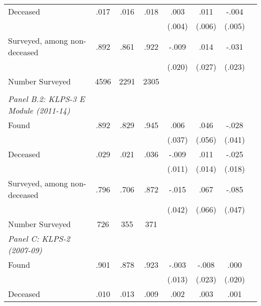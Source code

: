 \begin{tabular}{l*{7}{c}}
Deceased            &        .017&        .016&        .018&        .003         &        .011\sym{*}  &       -.004         \\
                    &            &            &            &      (.004)         &      (.006)         &      (.005)         \\
Surveyed, among non-deceased&        .892&        .861&        .922&       -.009         &        .014         &       -.031         \\
                    &            &            &            &      (.020)         &      (.027)         &      (.023)         \\
Number Surveyed     &        4596&        2291&        2305&                     &                     &                     \\
& & & & & & \\ \emph{Panel B.2: KLPS-3 E Module (2011-14)} & & & & & & \\ Found&        .892&        .829&        .945&        .006         &        .046         &       -.028         \\
                    &            &            &            &      (.037)         &      (.056)         &      (.041)         \\
Deceased            &        .029&        .021&        .036&       -.009         &        .011         &       -.025         \\
                    &            &            &            &      (.011)         &      (.014)         &      (.018)         \\
Surveyed, among non-deceased&        .796&        .706&        .872&       -.015         &        .067         &       -.085\sym{*}  \\
                    &            &            &            &      (.042)         &      (.066)         &      (.047)         \\
Number Surveyed     &         726&         355&         371&                     &                     &                     \\
\midrule
\emph{Panel C: KLPS-2 (2007-09)} & & & & & & \\ Found&        .901&        .878&        .923&       -.003         &       -.008         &        .000         \\
                    &            &            &            &      (.013)         &      (.023)         &      (.020)         \\
Deceased            &        .010&        .013&        .009&        .002         &        .003         &        .001         \\

\end{tabular}
